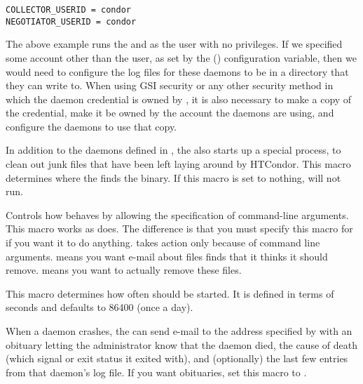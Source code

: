 \begin{description}
\begin{verbatim}
COLLECTOR_USERID = condor
NEGOTIATOR_USERID = condor
\end{verbatim}

  The above example runs the  and 
  as the  user with no  privileges.
  If we specified some account other than the  user,
  as set by the () configuration variable, then we
  would need to configure the log files for these daemons to be in a
  directory that they can write to.  When using GSI security or any
  other security method in which the daemon credential is owned by ,
  it is also necessary to make a copy of the credential, make it be
  owned by the account the daemons are using, and configure the daemons
  to use that copy.

\label{param:Preen}
\item[\Macro{PREEN}]
  In addition to the daemons
  defined in , the  also starts up
  a special process,  to clean out junk files that have
  been left laying around by HTCondor.  This macro determines where the
   finds the  binary.
  If this macro is set to nothing,  will not run.

\label{param:PreenArgs}
\item[\Macro{PREEN\_ARGS}]
  Controls how  behaves by allowing the specification
  of command-line arguments.
  This macro works as  does.
  The difference is that you must specify this macro for
   if you want it to do anything.
   takes action only
  because of command line arguments.
   means you want e-mail about files  finds that it
  thinks it should remove.
   means you want  to actually remove these files.

\item[\Macro{PREEN\_INTERVAL}]
\label{param:PreenInterval}
  This macro determines how often  should be started.
  It is defined in terms of seconds and defaults to 86400 (once a day).

\label{param:PublishObituaries}
\item[\Macro{PUBLISH\_OBITUARIES}]
  When a daemon crashes, the  can send e-mail to the
  address specified by  with an obituary letting
  the administrator know that the daemon died, the cause of
  death (which signal or exit status it exited with), and
  (optionally) the last few entries from that daemon's log file.  If
  you want obituaries, set this macro to .


\end{description}

